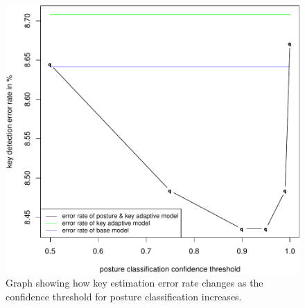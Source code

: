 \documentclass{sigchi}
\begin{document}
\begin{figure}[tb]
 \includegraphics[width=0.9\columnwidth]{figures/error-confidence-cropped.pdf}
  \caption{Graph showing how key estimation error rate changes as the confidence
  threshold for posture classification increases.}
  \label{fig:posture-confidence}
\end{figure}

\end{document}
